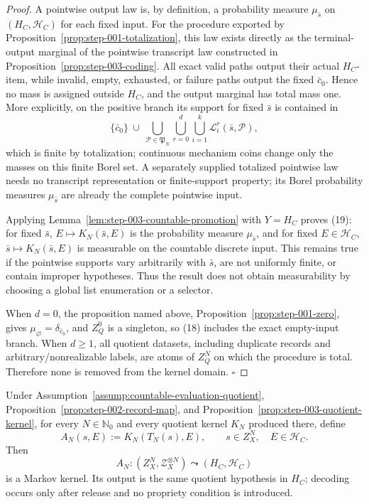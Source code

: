 \begin{proof}
A pointwise output law is, by definition, a probability measure
\(\mu_{\bar s}\) on \((H_C,\mathcal H_C)\) for each fixed input. For the
procedure exported by Proposition~\ref{prop:step-001-totalization}, this law exists directly as
the terminal-output marginal of the pointwise transcript law constructed in
Proposition~\ref{prop:step-003-coding}. All exact valid paths output
their actual \(H_C\)-item, while invalid, empty, exhausted, or failure paths
output the fixed \(\bar c_0\). Hence no mass is assigned outside \(H_C\),
and the output marginal has total mass one. More explicitly, on the
positive branch its support for fixed \(\bar s\) is contained in
\[
\{\bar c_0\}\ \cup\
\bigcup_{\mathcal P\in\mathfrak P_N}
\bigcup_{r=0}^{d}\bigcup_{i=1}^{k}
\mathcal L_i^r(\bar s,\mathcal P),
\tag{18a}
\]
which is finite by  totalization; continuous mechanism coins change
only the masses on this finite Borel set. A separately supplied totalized
pointwise law needs no transcript representation or finite-support
property; its Borel probability measures \(\mu_{\bar s}\) are already the
complete pointwise input.

Applying Lemma~\ref{lem:step-003-countable-promotion} with \(Y=H_C\) proves
(19): for fixed \(\bar s\), \(E\mapsto K_N(\bar s,E)\) is the probability
measure \(\mu_{\bar s}\), and for fixed \(E\in\mathcal H_C\),
\(\bar s\mapsto K_N(\bar s,E)\) is measurable on the countable discrete
input. This remains true if the pointwise supports vary arbitrarily with
\(\bar s\), are not uniformly finite, or contain improper hypotheses. Thus
the result does not obtain measurability by choosing a global list
enumeration or a selector.

When \(d=0\), the proposition named above,
Proposition~\ref{prop:step-001-zero}, gives
\(\mu_{\varnothing}=\delta_{\bar c_0}\), and \(Z_Q^0\) is a singleton, so
(18) includes the exact empty-input branch. When \(d\ge1\), all quotient
datasets, including duplicate records and arbitrary/nonrealizable labels,
are atoms of \(Z_Q^N\) on which the  procedure is total. Therefore
none is removed from the kernel domain. \(\square\)


\end{proof}

\begin{proposition}\label{prop:step-003-raw-pullback}
Under Assumption~\ref{assump:countable-evaluation-quotient}, Proposition~\ref{prop:step-002-record-map}, and
Proposition~\ref{prop:step-003-quotient-kernel}, for every
\(N\in\mathbb N_0\) and every quotient kernel \(K_N\) produced there, define
\[
A_N(s,E):=K_N(T_N(s),E),
\qquad s\in Z_X^N,\quad E\in\mathcal H_C.
\tag{20}
\]
Then
\[
A_N:(Z_X^N,\mathcal Z_X^{\otimes N})
\leadsto(H_C,\mathcal H_C)
\tag{21}
\]
is a Markov kernel. Its output is the same quotient hypothesis in \(H_C\);
decoding occurs only after release and no propriety condition is introduced.


\end{proposition}


